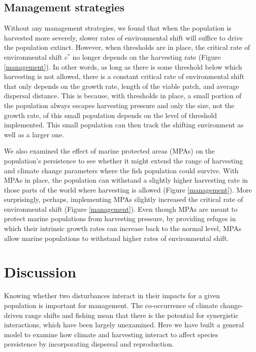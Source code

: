 \documentclass[12pt,english]{article}
\begin{document}
\begin{spacing}{1.9}
\begin{flushleft}
\subsection{Management strategies }

Without any management strategies, we found that when the population is harvested more severely, slower rates of environmental shift will suffice to drive the population extinct.  However, when thresholds are in place, the critical rate of environmental shift $c^*$ no longer depends on the harvesting rate (Figure \ref{management}). In other words, as long as there is some threshold below which harvesting is not allowed, there is a constant critical rate of environmental shift that only depends on the growth rate, length of the viable patch, and average dispersal distance.  This is because, with thresholds in place, a small portion of the population always escapes harvesting pressure and only the size, not the growth rate, of this small population depends on the level of threshold implemented.  This small population can then track the shifting environment as well as a larger one.

We also examined the effect of marine protected  areas (MPAs) on the population's persistence to see whether it might extend the range of harvesting and  climate change parameters where the fish population could survive. With MPAs in place, the population can withstand a slightly higher harvesting rate in those parts of the world where harvesting is allowed (Figure \ref{management}).  More surprisingly, perhaps, implementing MPAs slightly increased the critical rate of environmental shift (Figure \ref{management}).  Even though MPAs are meant to protect marine populations from harvesting pressure, by providing refuges in which their intrinsic growth rates can increase back to the normal level, MPAs allow marine populations to withstand higher rates of environmental shift.

\section{Discussion}

Knowing whether two disturbances interact in their impacts for a given population is important for management. The co-occurrence of climate change-driven range shifts and fishing mean that there is the potential for synergistic interactions, which have been largely unexamined.  Here we have built a general model to examine how climate and harvesting interact to affect species persistence by incorporating dispersal and reproduction. 


\end{flushleft}
\end{spacing}
\end{document}
